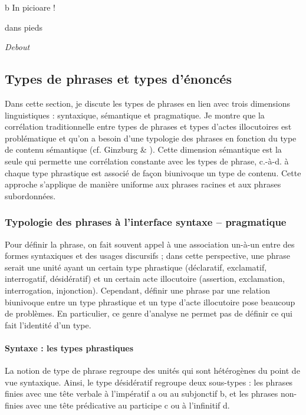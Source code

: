   b  In  picioare !

    dans  pieds

{\itshape
Debout}

\subsection{Types de phrases et types d'énoncés}
\label{bkm:Ref299353216}\label{bkm:Ref299380411}Dans cette section, je discute les types de phrases en lien avec trois dimensions linguistiques : syntaxique, sémantique et pragmatique. Je montre que la corrélation traditionnelle entre types de phrases et types d'actes illocutoires est problématique et qu'on a besoin d'une typologie des phrases en fonction du type de contenu sémantique (cf. Ginzburg \& \citet{Sag2000}). Cette dimension sémantique est la seule qui permette une corrélation constante avec les types de phrase, c.-à-d. à chaque type phrastique est associé de façon biunivoque un type de contenu. Cette approche s'applique de manière uniforme aux phrases racines et aux phrases subordonnées. 

\subsubsection{Typologie des phrases à l'interface syntaxe -- pragmatique} 
Pour définir la phrase, on fait souvent appel à une association un-à-un entre des formes syntaxiques et des usages discursifs ; dans cette perspective, une phrase serait une unité ayant un certain type phrastique (déclaratif, exclamatif, interrogatif, désidératif) et un certain acte illocutoire (assertion, exclamation, interrogation, injonction). Cependant, définir une phrase par une relation biunivoque entre un type phrastique et un type d'acte illocutoire pose beaucoup de problèmes. En particulier, ce genre d'analyse ne permet pas de définir ce qui fait l'identité d'un type.

\paragraph[Syntaxe~: les types phrastiques]{Syntaxe : les types phrastiques}
La notion de type de phrase regroupe des unités qui sont hétérogènes du point de vue syntaxique. Ainsi, le type désidératif regroupe deux sous-types : les phrases finies avec une tête verbale à l'impératif a ou au subjonctif b, et les phrases non-finies avec une tête prédicative au participe c ou à l'infinitif d. 


